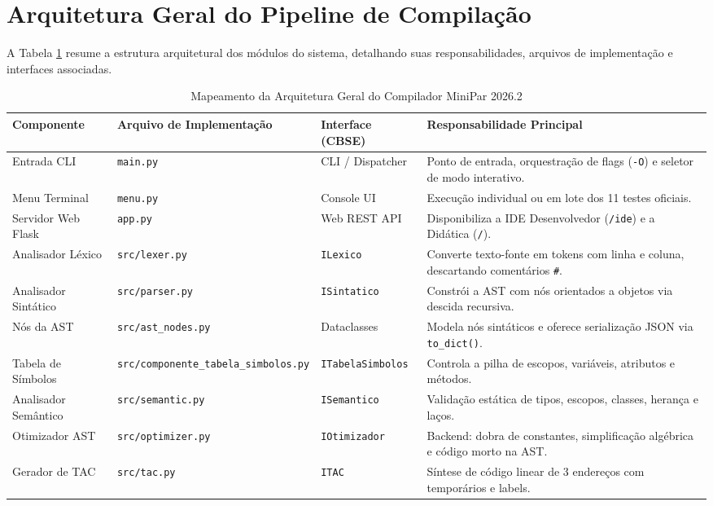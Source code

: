 \section{Arquitetura Geral do Pipeline de Compilação}

A Tabela \ref{tab:arquitetura_geral} resume a estrutura arquitetural dos módulos do sistema, detalhando suas responsabilidades, arquivos de implementação e interfaces associadas.

\begin{table}[htbp]
\centering
\caption{Mapeamento da Arquitetura Geral do Compilador MiniPar 2026.2}
\label{tab:arquitetura_geral}
\small
\begin{tabular}{p{3.2cm}p{3.8cm}p{2.8cm}p{5cm}}
\toprule
Componente & Arquivo de Implementação & Interface (CBSE) & Responsabilidade Principal \\
\midrule
Entrada CLI & \texttt{main.py} & CLI / Dispatcher & Ponto de entrada, orquestração de flags (\texttt{-O}) e seletor de modo interativo. \\
Menu Terminal & \texttt{menu.py} & Console UI & Execução individual ou em lote dos 11 testes oficiais. \\
Servidor Web Flask & \texttt{app.py} & Web REST API & Disponibiliza a IDE Desenvolvedor (\texttt{/ide}) e a Didática (\texttt{/}). \\
Analisador Léxico & \texttt{src/lexer.py} & \texttt{ILexico} & Converte texto-fonte em tokens com linha e coluna, descartando comentários \texttt{\#}. \\
Analisador Sintático & \texttt{src/parser.py} & \texttt{ISintatico} & Constrói a AST com nós orientados a objetos via descida recursiva. \\
Nós da AST & \texttt{src/ast\_nodes.py} & Dataclasses & Modela nós sintáticos e oferece serialização JSON via \texttt{to\_dict()}. \\
Tabela de Símbolos & \texttt{src/componente\_tabela\_simbolos.py} & \texttt{ITabelaSimbolos} & Controla a pilha de escopos, variáveis, atributos e métodos. \\
Analisador Semântico & \texttt{src/semantic.py} & \texttt{ISemantico} & Validação estática de tipos, escopos, classes, herança e laços. \\
Otimizador AST & \texttt{src/optimizer.py} & \texttt{IOtimizador} & Backend: dobra de constantes, simplificação algébrica e código morto na AST. \\
Gerador de TAC & \texttt{src/tac.py} & \texttt{ITAC} & Síntese de código linear de 3 endereços com temporários e labels. \\

\end{tabular}
\end{table}
